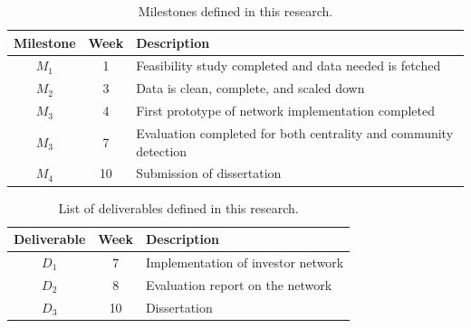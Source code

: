 \documentclass[a4paper,11pt]{article}
\begin{document}
\begin{table}[htbp]
    \begin{center}
        \begin{tabular}{|c|c|l|}
        \hline
        \textbf{Milestone} & \textbf{Week} & \textbf{Description} \\
        \hline
        $M_1$ & 1 & Feasibility study completed and data needed is fetched \\
        $M_2$ & 3 & Data is clean, complete, and scaled down \\
        $M_3$ & 4 & First prototype of network implementation completed \\
        $M_3$ & 7 & Evaluation completed for both centrality and community detection \\
        $M_4$ & 10 & Submission of dissertation \\
        \hline
        \end{tabular} 
    \end{center}
    \caption{Milestones defined in this research.}
    \label{fig:milestones}
\end{table}

\begin{table}[htbp]
    \begin{center}
        \begin{tabular}{|c|c|l|}
        \hline
        \textbf{Deliverable} & \textbf{Week} & \textbf{Description} \\
        \hline
        $D_1$ & 7 & Implementation of investor network \\
        $D_2$ & 8 & Evaluation report on the network \\
        $D_3$ & 10 & Dissertation \\
        \hline
        \end{tabular} 
    \end{center}
    \caption{List of deliverables defined in this research.}
    \label{fig:deliverables}
\end{table}



{\small
}
\end{document}
